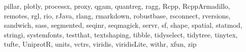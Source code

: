 \documentclass[
]{book}
\newenvironment{Shaded}{\begin{snugshade}}{\end{snugshade}}
\newcommand{\NormalTok}[1]{#1}
\newcommand{\StringTok}[1]{\textcolor[rgb]{0.31,0.60,0.02}{#1}}
\begin{document}
\begin{Shaded}
\begin{Highlighting}[]
  \StringTok{\textquotesingle{}pillar\textquotesingle{}}\NormalTok{, }\StringTok{\textquotesingle{}plotly\textquotesingle{}}\NormalTok{, }\StringTok{\textquotesingle{}processx\textquotesingle{}}\NormalTok{, }\StringTok{\textquotesingle{}proxy\textquotesingle{}}\NormalTok{, }\StringTok{\textquotesingle{}qgam\textquotesingle{}}\NormalTok{, }\StringTok{\textquotesingle{}quantreg\textquotesingle{}}\NormalTok{, }\StringTok{\textquotesingle{}ragg\textquotesingle{}}\NormalTok{, }\StringTok{\textquotesingle{}Rcpp\textquotesingle{}}\NormalTok{,}
  \StringTok{\textquotesingle{}RcppArmadillo\textquotesingle{}}\NormalTok{, }\StringTok{\textquotesingle{}remotes\textquotesingle{}}\NormalTok{, }\StringTok{\textquotesingle{}rgl\textquotesingle{}}\NormalTok{, }\StringTok{\textquotesingle{}rio\textquotesingle{}}\NormalTok{, }\StringTok{\textquotesingle{}rJava\textquotesingle{}}\NormalTok{, }\StringTok{\textquotesingle{}rlang\textquotesingle{}}\NormalTok{, }\StringTok{\textquotesingle{}rmarkdown\textquotesingle{}}\NormalTok{, }\StringTok{\textquotesingle{}robustbase\textquotesingle{}}\NormalTok{,}
  \StringTok{\textquotesingle{}rsconnect\textquotesingle{}}\NormalTok{, }\StringTok{\textquotesingle{}rversions\textquotesingle{}}\NormalTok{, }\StringTok{\textquotesingle{}sandwich\textquotesingle{}}\NormalTok{, }\StringTok{\textquotesingle{}sass\textquotesingle{}}\NormalTok{, }\StringTok{\textquotesingle{}segmented\textquotesingle{}}\NormalTok{, }\StringTok{\textquotesingle{}seqinr\textquotesingle{}}\NormalTok{, }\StringTok{\textquotesingle{}seqmagick\textquotesingle{}}\NormalTok{, }\StringTok{\textquotesingle{}servr\textquotesingle{}}\NormalTok{,}
  \StringTok{\textquotesingle{}sf\textquotesingle{}}\NormalTok{, }\StringTok{\textquotesingle{}shape\textquotesingle{}}\NormalTok{, }\StringTok{\textquotesingle{}spatial\textquotesingle{}}\NormalTok{, }\StringTok{\textquotesingle{}statmod\textquotesingle{}}\NormalTok{, }\StringTok{\textquotesingle{}stringi\textquotesingle{}}\NormalTok{, }\StringTok{\textquotesingle{}systemfonts\textquotesingle{}}\NormalTok{, }\StringTok{\textquotesingle{}testthat\textquotesingle{}}\NormalTok{, }\StringTok{\textquotesingle{}textshaping\textquotesingle{}}\NormalTok{,}
  \StringTok{\textquotesingle{}tibble\textquotesingle{}}\NormalTok{, }\StringTok{\textquotesingle{}tidyselect\textquotesingle{}}\NormalTok{, }\StringTok{\textquotesingle{}tidytree\textquotesingle{}}\NormalTok{, }\StringTok{\textquotesingle{}tinytex\textquotesingle{}}\NormalTok{, }\StringTok{\textquotesingle{}tufte\textquotesingle{}}\NormalTok{, }\StringTok{\textquotesingle{}UniprotR\textquotesingle{}}\NormalTok{, }\StringTok{\textquotesingle{}units\textquotesingle{}}\NormalTok{, }\StringTok{\textquotesingle{}vctrs\textquotesingle{}}\NormalTok{,}
  \StringTok{\textquotesingle{}viridis\textquotesingle{}}\NormalTok{, }\StringTok{\textquotesingle{}viridisLite\textquotesingle{}}\NormalTok{, }\StringTok{\textquotesingle{}withr\textquotesingle{}}\NormalTok{, }\StringTok{\textquotesingle{}xfun\textquotesingle{}}\NormalTok{, }\StringTok{\textquotesingle{}zip\textquotesingle{}}
\end{Highlighting}
\end{Shaded}
\end{document}
